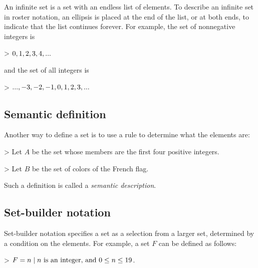 An infinite set is a set with an endless list of elements. To describe an infinite set in
roster notation, an ellipsis is placed at the end of the list, or at both ends, to
indicate that the list continues forever. For example, the set of nonnegative integers is



> $\\{0, 1, 2, 3, 4, ...\\}$



and the set of all integers is



> $\\{..., -3, -2, -1, 0, 1, 2, 3, ...\\}$




\subsection{Semantic definition}
\label{sss:sema-a646}




Another way to define a set is to use a rule to determine what the elements are:



> Let $A$ be the set whose members are the first four positive integers.

> Let $B$ be the set of colors of the French flag.



Such a definition is called a \textit{semantic description}.




\subsection{Set-builder notation}
\label{sss:setb-75c9}




Set-builder notation specifies a set as a selection from a larger set, determined by a
condition on the elements. For example, a set $F$ can be defined as follows:



> $ F = \\{n \mid n \text{ is an integer, and } 0 \leq n \leq 19\\}$.



